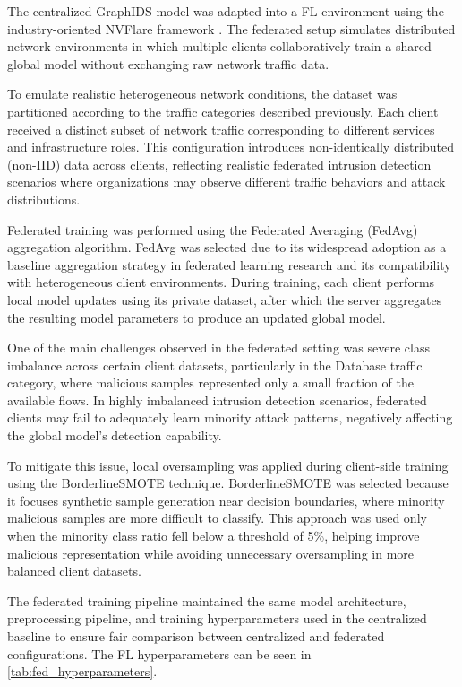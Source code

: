 \documentclass[conference]{IEEEtran}
\begin{document}
The centralized GraphIDS model was adapted into a FL environment using the industry-oriented NVFlare framework \cite{roth2024}. The federated setup simulates distributed network environments in which multiple clients collaboratively train a shared global model without exchanging raw network traffic data.

To emulate realistic heterogeneous network conditions, the dataset was partitioned according to the traffic categories described previously. Each client received a distinct subset of network traffic corresponding to different services and infrastructure roles. This configuration introduces non-identically distributed (non-IID) data across clients, reflecting realistic federated intrusion detection scenarios where organizations may observe different traffic behaviors and attack distributions.

Federated training was performed using the Federated Averaging (FedAvg) aggregation algorithm. FedAvg was selected due to its widespread adoption as a baseline aggregation strategy in federated learning research and its compatibility with heterogeneous client environments. During training, each client performs local model updates using its private dataset, after which the server aggregates the resulting model parameters to produce an updated global model.

One of the main challenges observed in the federated setting was severe class imbalance across certain client datasets, particularly in the Database traffic category, where malicious samples represented only a small fraction of the available flows. In highly imbalanced intrusion detection scenarios, federated clients may fail to adequately learn minority attack patterns, negatively affecting the global model’s detection capability.

To mitigate this issue, local oversampling was applied during client-side training using the BorderlineSMOTE technique. BorderlineSMOTE was selected because it focuses synthetic sample generation near decision boundaries, where minority malicious samples are more difficult to classify. This approach was used only when the minority class ratio fell below a threshold of 5\%, helping improve malicious representation while avoiding unnecessary oversampling in more balanced client datasets.

The federated training pipeline maintained the same model architecture, preprocessing pipeline, and training hyperparameters used in the centralized baseline to ensure fair comparison between centralized and federated configurations. The FL hyperparameters can be seen in \autoref{tab:fed_hyperparameters}.
\end{document}

